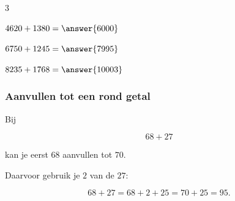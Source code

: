 \documentclass{ximera}
\begin{document}
\begin{oefening}{\oefB\ESS}
\begin{multicols}{3}
    \begin{question} \(4620+1380=\answer{6000}\) \end{question}
    
    \begin{question} \(6750+1245=\answer{7995}\) \end{question}
    
    \begin{question} \(8235+1768=\answer{10003}\) \end{question}
    
    \end{multicols}
    
    \end{oefening}



\subsubsection*{Aanvullen tot een rond getal}

Bij

\[
68+27
\]

kan je eerst \(68\) aanvullen tot \(70\).

Daarvoor gebruik je \(2\) van de \(27\):

\[
68+27
=
68+2+25
=
70+25
=
95.
\]
\end{document}
